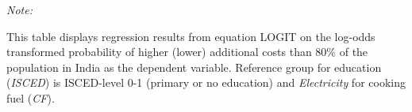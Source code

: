 \begin{table}[htbp!]
\begin{adjustbox}{width = 1\textwidth, max height = 0.95\textheight, center}
\begin{threeparttable}[b]
         \begin{tablenotes}\item \medskip \textit{Note:}
            \item This table displays regression results from equation LOGIT on the log-odds transformed probability of higher (lower) additional costs than 80\% of the population in India as the dependent variable. Reference group for education (\textit{ISCED}) is ISCED-level 0-1 (primary or no education) and \textit{Electricity} for cooking fuel (\textit{CF}).
         \end{tablenotes}
      \end{threeparttable}
   \end{adjustbox}
\end{table}


